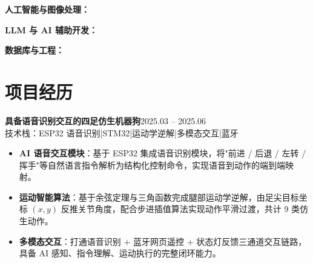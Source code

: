 \documentclass[10pt,a4paper]{article}
\newcommand{\projectblock}[3]{%
    {\bfseries\color{darktext}#1}\hfill{\color{graytext}#2}\\%
    {\small\color{graytext}#3}%
    \vspace{0.2em}%
}
\begin{document}
\vspace{2pt}

{\bfseries\color{primary}人工智能与图像处理：}

\vspace{2pt}

{\bfseries\color{primary}LLM 与 AI 辅助开发：}

\vspace{2pt}

{\bfseries\color{primary}数据库与工程：}

\section{\faProjectDiagram\hspace{0.4em}项目经历}

\projectblock{具备语音识别交互的四足仿生机器狗}{2025.03 -- 2025.06}{技术栈：ESP32 语音识别\hspace{0.3em}|\hspace{0.3em}STM32\hspace{0.3em}|\hspace{0.3em}运动学逆解\hspace{0.3em}|\hspace{0.3em}多模态交互\hspace{0.3em}|\hspace{0.3em}蓝牙}

\begin{itemize}[leftmargin=1.5em, itemsep=2pt, parsep=0pt, topsep=2pt]
    \item \textbf{AI 语音交互模块}：基于 ESP32 集成语音识别模块，将"前进 / 后退 / 左转 / 挥手"等自然语言指令解析为结构化控制命令，实现语音到动作的端到端映射。
    \item \textbf{运动智能算法}：基于余弦定理与三角函数完成腿部运动学逆解，由足尖目标坐标 $(x,y)$ 反推关节角度，配合步进插值算法实现动作平滑过渡，共计 9 类仿生动作。
    \item \textbf{多模态交互}：打通语音识别 + 蓝牙网页遥控 + 状态灯反馈三通道交互链路，具备 AI 感知、指令理解、运动执行的完整闭环能力。
\end{itemize}
\end{document}
